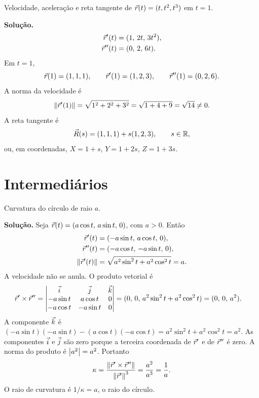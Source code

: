 \documentclass[11pt,a4paper]{article}
\begin{document}
\begin{exercicio}[Básico --- B4]
Velocidade, aceleração e reta tangente de \(\vec{r}(t)=(t,t^{2},t^{3})\) em \(t=1\).
\end{exercicio}

\noindent\textbf{Solução.}
\begin{align*}
\vec{r}'(t)&=(1,\,2t,\,3t^{2}),\\
\vec{r}''(t)&=(0,\,2,\,6t).
\end{align*}
Em \(t=1\),
\[
\vec{r}(1)=(1,1,1),
\qquad
\vec{r}'(1)=(1,2,3),
\qquad
\vec{r}''(1)=(0,2,6).
\]
A norma da velocidade é
\[
\left\lVert \vec{r}'(1) \right\rVert=\sqrt{1^{2}+2^{2}+3^{2}}=\sqrt{1+4+9}=\sqrt{14}\neq 0.
\]
A reta tangente é
\[
\vec{R}(s)=(1,1,1)+s(1,2,3),\qquad s\in\mathbb{R},
\]
ou, em coordenadas, \(X=1+s\), \(Y=1+2s\), \(Z=1+3s\).

\section{Intermediários}

\begin{exercicio}[Intermediário --- I1]
Curvatura do círculo de raio \(a\).
\end{exercicio}

\noindent\textbf{Solução.}
Seja \(\vec{r}(t)=(a\cos t,\,a\sin t,\,0)\), com \(a>0\). Então
\begin{align*}
\vec{r}'(t)&=(-a\sin t,\,a\cos t,\,0),\\
\vec{r}''(t)&=(-a\cos t,\,-a\sin t,\,0),\\
\left\lVert \vec{r}'(t) \right\rVert
&=\sqrt{a^{2}\sin^{2}t+a^{2}\cos^{2}t}
=a.
\end{align*}
A velocidade não se anula. O produto vetorial é
\begin{align*}
\vec{r}'\times\vec{r}''
&=
\begin{vmatrix}
\vec{i}&\vec{j}&\vec{k}\\
-a\sin t&a\cos t&0\\
-a\cos t&-a\sin t&0
\end{vmatrix}
=(0,\,0,\,a^{2}\sin^{2}t+a^{2}\cos^{2}t)
=(0,\,0,\,a^{2}).
\end{align*}
A componente \(\vec{k}\) é \((-a\sin t)(-a\sin t)-(a\cos t)(-a\cos t)=a^{2}\sin^{2}t+a^{2}\cos^{2}t=a^{2}\). As componentes \(\vec{i}\) e \(\vec{j}\) são zero porque a terceira coordenada de \(\vec{r}'\) e de \(\vec{r}''\) é zero. A norma do produto é \(\left\lvert a^{2} \right\rvert=a^{2}\). Portanto
\[
\kappa
=\frac{\left\lVert \vec{r}'\times\vec{r}'' \right\rVert}{\left\lVert \vec{r}' \right\rVert^{3}}
=\frac{a^{2}}{a^{3}}
=\frac{1}{a}.
\]
O raio de curvatura é \(1/\kappa=a\), o raio do círculo.
\end{document}
